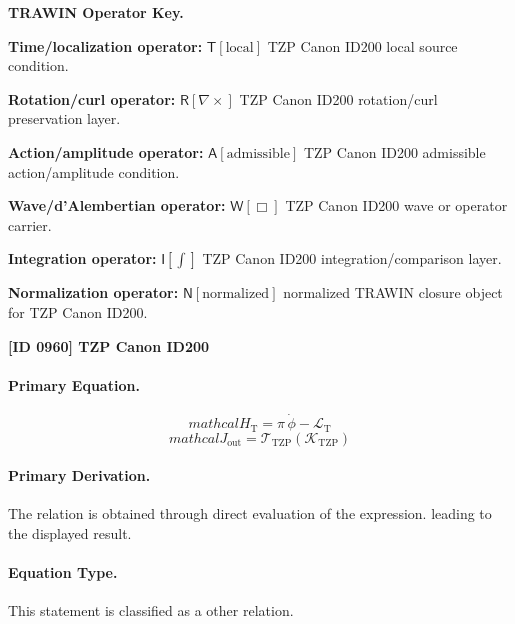 \par\vspace{0.45\baselineskip}
\noindent\begin{minipage}[t]{\linewidth}
\begingroup
\small
\raggedright
\textbf{TRAWIN Operator Key.}\par
\noindent\textbf{Time/localization operator:} $\mathsf{T}\!\left[\mathrm{local}\right]$ TZP Canon ID200 local source condition.\par
\noindent\textbf{Rotation/curl operator:} $\mathsf{R}\!\left[\nabla\times\right]$ TZP Canon ID200 rotation/curl preservation layer.\par
\noindent\textbf{Action/amplitude operator:} $\mathsf{A}\!\left[\mathrm{admissible}\right]$ TZP Canon ID200 admissible action/amplitude condition.\par
\noindent\textbf{Wave/d'Alembertian operator:} $\mathsf{W}\!\left[\Box\right]$ TZP Canon ID200 wave or operator carrier.\par
\noindent\textbf{Integration operator:} $\mathsf{I}\!\left[\int\right]$ TZP Canon ID200 integration/comparison layer.\par
\noindent\textbf{Normalization operator:} $\mathsf{N}\!\left[\mathrm{normalized}\right]$ normalized TRAWIN closure object for TZP Canon ID200.\par
\endgroup
\end{minipage}

\clearpage
\noindent\textbf{[ID 0960] TZP Canon ID200}\par
\vspace{0.35em}
\paragraph{Primary Equation.}
\[
mathcal{H}_{\mathrm{T}}=\pi\,\dot{\phi}-\mathcal{L}_{\mathrm{T}}
\]
\[
mathcal{J}_{\mathrm{out}} = \mathcal{T}_{\mathrm{TZP}}\!\left(\mathcal{K}_{\mathrm{TZP}}\right)
\]

\paragraph{Primary Derivation.}
The relation is obtained through direct evaluation of the expression. leading to the displayed result.
\paragraph{Equation Type.}
This statement is classified as a other relation.

